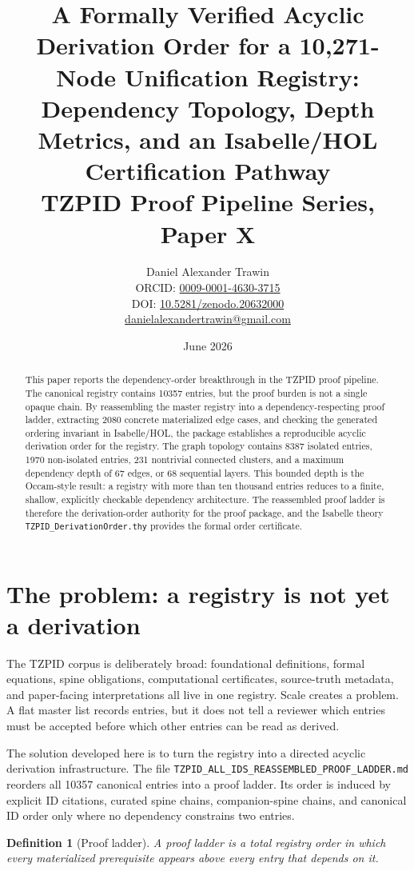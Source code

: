 \documentclass[11pt]{article}
\title{A Formally Verified Acyclic Derivation Order for a 10,271-Node Unification Registry:\\ Dependency Topology, Depth Metrics, and an Isabelle/HOL Certification Pathway\\[0.6em]
\large TZPID Proof Pipeline Series, Paper X}
\author{Daniel Alexander Trawin\\
\small ORCID: \href{https://orcid.org/0009-0001-4630-3715}{0009-0001-4630-3715}\\
\small DOI: \href{https://doi.org/10.5281/zenodo.20632000}{10.5281/zenodo.20632000}\\
\small \href{mailto:danielalexandertrawin@gmail.com}{danielalexandertrawin@gmail.com}}
\date{June 2026}
\newtheorem{definition}[theorem]{Definition}
\theoremstyle{remark}
\begin{document}
\maketitle

\begin{abstract}
This paper reports the dependency-order breakthrough in the TZPID proof pipeline. The canonical registry contains 10357 entries, but the proof burden is not a single opaque chain. By reassembling the master registry into a dependency-respecting proof ladder, extracting 2080 concrete materialized edge cases, and checking the generated ordering invariant in Isabelle/HOL, the package establishes a reproducible acyclic derivation order for the registry. The graph topology contains 8387 isolated entries, 1970 non-isolated entries, 231 nontrivial connected clusters, and a maximum dependency depth of 67 edges, or 68 sequential layers. This bounded depth is the Occam-style result: a registry with more than ten thousand entries reduces to a finite, shallow, explicitly checkable dependency architecture. The reassembled proof ladder is therefore the derivation-order authority for the proof package, and the Isabelle theory \texttt{TZPID\_DerivationOrder.thy} provides the formal order certificate.
\end{abstract}

\section{The problem: a registry is not yet a derivation}
\label{sec:problem}

The TZPID corpus is deliberately broad: foundational definitions, formal equations, spine obligations, computational certificates, source-truth metadata, and paper-facing interpretations all live in one registry. Scale creates a problem. A flat master list records entries, but it does not tell a reviewer which entries must be accepted before which other entries can be read as derived.

The solution developed here is to turn the registry into a directed acyclic derivation infrastructure. The file \texttt{TZPID\_ALL\_IDS\_REASSEMBLED\_PROOF\_LADDER.md} reorders all 10357 canonical entries into a proof ladder. Its order is induced by explicit ID citations, curated spine chains, companion-spine chains, and canonical ID order only where no dependency constrains two entries.

\begin{definition}[Proof ladder]
A proof ladder is a total registry order in which every materialized prerequisite appears above every entry that depends on it.
\end{definition}
\end{document}
